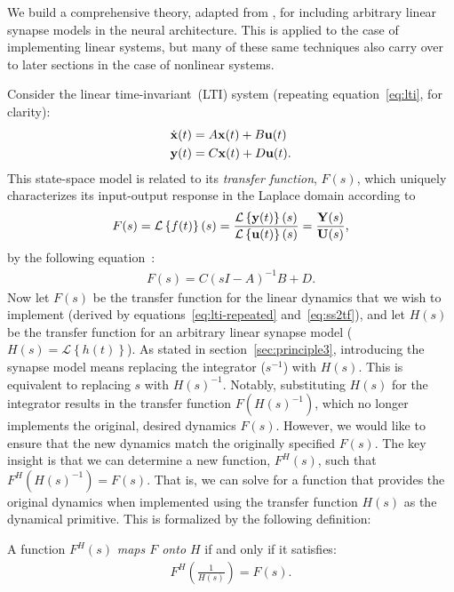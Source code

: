 We build a comprehensive theory, adapted from \citet{voelker2018}, for including arbitrary linear synapse models in the neural architecture.
This is applied to the case of implementing linear systems, but many of these same techniques also carry over to later sections in the case of nonlinear systems. %

Consider the linear time-invariant~(LTI) system (repeating equation~\ref{eq:lti}, for clarity):
\begin{equation} \label{eq:lti-repeated}
\begin{split}
\dot{\mathbf{x}}(t) &= A\mathbf{x}(t) + B\mathbf{u}(t) \\
\mathbf{y}(t) &= C\mathbf{x}(t) + D\mathbf{u}(t) \text{.}
\end{split}
\end{equation}
This state-space model is related to its \emph{transfer function}, $F(s)$, which uniquely characterizes its input-output response in the Laplace domain according to
$$
F(s) = \mathcal{L}\left\{{f(t)}\right\}(s) = \frac{\mathcal{L}\left\{{\mathbf{y}(t)}\right\}(s)}{\mathcal{L}\left\{{\mathbf{u}(t)}\right\}(s)} = \frac{\mathbf{Y}(s)}{\mathbf{U}(s)} \text{,}
$$
by the following equation~\citep{brogan1982modern}:
\begin{align} \label{eq:ss2tf}
F(s) = C(sI - A)^{-1}B + D \text{.}
\end{align}
Now let $F(s)$ be the transfer function for the linear dynamics that we wish to implement (derived by equations~\ref{eq:lti-repeated} and~\ref{eq:ss2tf}), and let $H(s)$ be the transfer function for an arbitrary linear synapse model ($H(s) = \mathcal{L} \left\{ h(t) \right\}$).
As stated in section~\ref{sec:principle3}, introducing the synapse model means replacing the integrator ($s^{-1}$) with $H(s)$.
This is equivalent to replacing $s$ with $H(s)^{-1}$.
Notably, substituting $H(s)$ for the integrator results in the transfer function $F \left( H(s)^{-1} \right)$, which no longer implements the original, desired dynamics $F(s)$. %
However, we would like to ensure that the new dynamics match the originally specified $F(s)$.
The key insight is that we can determine a new function, $F^H(s)$, such that $F^{H}\left( H(s)^{-1} \right) = F(s)$.
That is, we can solve for a function that provides the original dynamics when implemented using the transfer function $H(s)$ as the dynamical primitive.
This is formalized by the following definition:
\begin{definition} \label{def:maps-onto}
A function $F^{H}(s)$ \emph{maps $F$ onto $H$} if and only if it satisfies:
\begin{align} \label{eq:maps-onto}
F^{H}\left( \frac{1}{H(s)} \right) = F(s) \text{.}
\end{align}
\end{definition}

